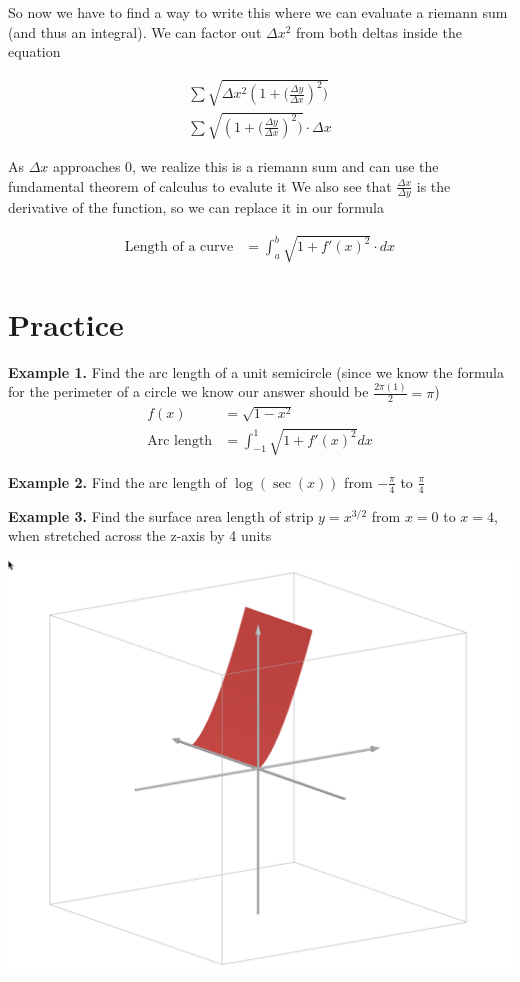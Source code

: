 \documentclass[12pt]{extarticle}
\begin{document}
So now we have to find a way to write this where we can evaluate a riemann sum (and thus an integral).
We can factor out $\Delta x^2$ from both deltas inside the equation

\begin{align}   
    \sum \sqrt{{\Delta x^2}(1 + {(\frac{\Delta y}{\Delta x}})^2)} \\
    \sum \sqrt{(1 + {(\frac{\Delta y}{\Delta x}})^2)} \cdot \Delta x
\end{align}

As $\Delta x$ approaches 0, we realize this is a riemann sum and can use the fundamental theorem of calculus to evalute it 
We also see that $\frac{\Delta x}{\Delta y}$ is the derivative of the function, so we can replace it in our formula

\begin{align}
    \text{Length of a curve} &= \int_{a}^{b} \sqrt{1 + f'(x)^2} \cdot dx
\end{align}

\section{Practice}
\textbf{Example 1.} Find the arc length of a unit semicircle (since we know the formula for the perimeter of a circle we know our answer should be $\frac{2\pi (1)}{2} = \pi$)
\begin{align}
    f(x) &= \sqrt{1-x^2} \\
    \text{Arc length} &= \int_{-1}^{1} \sqrt{1 + f'(x)^2} dx 
\end{align}

\begin{center}
\end{center}

\vspace{10cm}


\textbf{Example 2.} Find the arc length of $\log(\sec(x))$ from $-\frac{\pi}{4}$ to $\frac{\pi}{4}$

\vspace{10cm}

\textbf{Example 3.} Find the surface area length of strip $y = x^{3/2} $ from $x = 0$ to $x= 4$, when stretched across the z-axis by 4 units

\begin{center}
    \includegraphics[height = 0.2\textwidth]{Surface.png}
\end{center}
\end{document}
